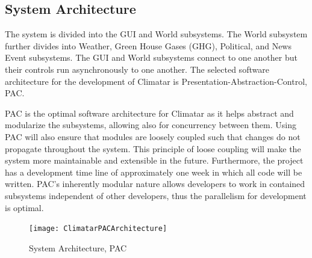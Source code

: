 \documentclass[]{article}
\begin{document}
\subsection{System Architecture}
\label{sub:system_architecture}

The system is divided into the GUI and World subsystems. The World subsystem further divides into Weather, Green House Gases (GHG), Political, and News Event subsystems. The GUI and World subsystems connect to one another but their controls run asynchronously to one another. The selected software architecture for the development of Climatar is Presentation-Abstraction-Control, PAC.

\vspace{3mm}

PAC is the optimal software architecture for Climatar as it helps abstract and modularize the subsystems, allowing also for concurrency between them. Using PAC will also ensure that modules are loosely coupled such that changes do not propagate throughout the system. This principle of loose coupling will make the system more maintainable and extensible in the future. Furthermore, the project has a development time line of approximately one week in which all code will be written. PAC's inherently modular nature allows developers to work in contained subsystems independent of other developers, thus the parallelism for development is optimal.

\begin{figure}[ht!]
\centering
\texttt{[image: ClimatarPACArchitecture]}
\caption{System Architecture, PAC\label{pacarch}}
\end{figure}

\end{document}
